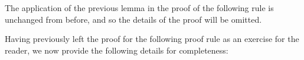 The application of the previous lemma in the proof of the following rule is unchanged from before, and so the details of the proof will be omitted.



%
%



Having previously left the proof for the following proof rule as an exercise for the reader, we now provide the following details for completeness:


